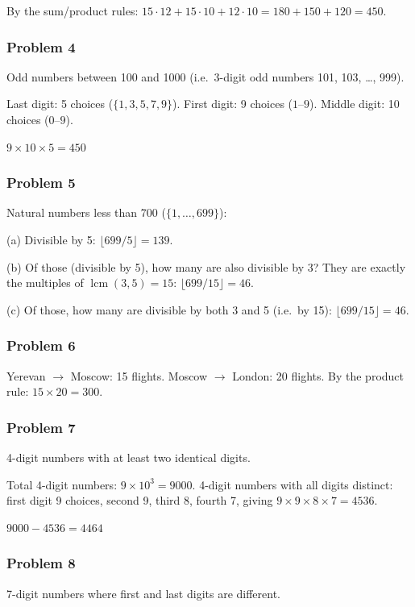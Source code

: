 By the sum/product rules:
$15\cdot12 + 15\cdot10 + 12\cdot10 = 180+150+120 = \boxed{450}$.

\subsubsection*{Problem 4}
Odd numbers between 100 and 1000 (i.e.\ 3-digit odd numbers 101, 103, \ldots, 999).

Last digit: 5 choices ($\{1,3,5,7,9\}$).
First digit: 9 choices ($1$--$9$).
Middle digit: 10 choices ($0$--$9$).

$\boxed{9 \times 10 \times 5 = 450}$

\subsubsection*{Problem 5}
Natural numbers less than 700 ($\{1,\dots,699\}$):

(a) Divisible by 5: $\lfloor 699/5\rfloor = \boxed{139}$.

(b) Of those (divisible by 5), how many are also divisible by 3? They are exactly the multiples of $\operatorname{lcm}(3,5)=15$: $\lfloor 699/15\rfloor = \boxed{46}$.

(c) Of those, how many are divisible by both 3 and 5 (i.e.\ by 15): $\lfloor 699/15\rfloor = \boxed{46}$.

\subsubsection*{Problem 6}
Yerevan $\to$ Moscow: 15 flights. Moscow $\to$ London: 20 flights.
By the product rule: $\boxed{15 \times 20 = 300}$.

\subsubsection*{Problem 7}
4-digit numbers with at least two identical digits.

Total 4-digit numbers: $9\times 10^3 = 9000$.
4-digit numbers with all digits distinct: first digit 9 choices, second 9, third 8, fourth 7, giving $9\times 9\times 8\times 7 = 4536$.

$\boxed{9000 - 4536 = 4464}$

\subsubsection*{Problem 8}
7-digit numbers where first and last digits are different.

